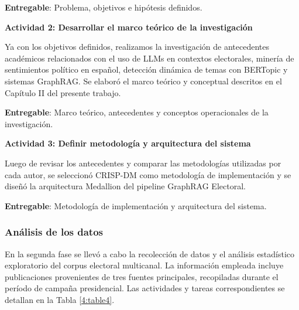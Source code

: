 \documentclass[listof=nochaptergap,12pt,times,authoryear]{report}
\begin{document}
\textbf{Entregable}: Problema, objetivos e hipótesis definidos.
 
\textbf{Actividad 2: Desarrollar el marco teórico de la investigación}
 
Ya con los objetivos definidos, realizamos la investigación de antecedentes académicos relacionados con el uso de LLMs en contextos electorales, minería de sentimientos político en español, detección dinámica de temas con BERTopic y sistemas GraphRAG. Se elaboró el marco teórico y conceptual descritos en el Capítulo II del presente trabajo.
 
\textbf{Entregable}: Marco teórico, antecedentes y conceptos operacionales de la investigación.
 
\textbf{Actividad 3: Definir metodología y arquitectura del sistema}
 
Luego de revisar los antecedentes y comparar las metodologías utilizadas por cada autor, se seleccionó CRISP-DM como metodología de implementación y se diseñó la arquitectura Medallion del pipeline GraphRAG Electoral.
 
\textbf{Entregable}: Metodología de implementación y arquitectura del sistema.
 
\subsubsection{Análisis de los datos}
 
En la segunda fase se llevó a cabo la recolección de datos y el análisis estadístico exploratorio del corpus electoral multicanal. La información empleada incluye publicaciones provenientes de tres fuentes principales, recopiladas durante el período de campaña presidencial. Las actividades y tareas correspondientes se detallan en la Tabla \ref{4:table4}.
 
\end{document}
